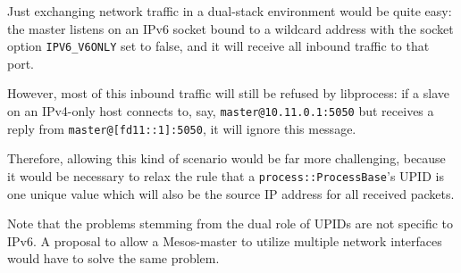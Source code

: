\documentclass{scrreprt}
\begin{document}
Just exchanging network traffic in a dual-stack environment would be quite
easy: the master listens on an IPv6 socket bound to a wildcard address
with the socket option \texttt{IPV6\_V6ONLY} set to false, and it will
receive all inbound traffic to that port.

However, most of this inbound traffic will still be refused by libprocess: if a
slave on an IPv4-only host connects to, say, \texttt{master@10.11.0.1:5050} but
receives a reply from \texttt{master@[fd11::1]:5050}, it will ignore this message.

Therefore, allowing this kind of scenario would be far more challenging,
because it would be necessary to relax the rule that a \texttt{process::ProcessBase}'s
UPID is one unique value which will also be the source IP address for all
received packets.

Note that the problems stemming from the dual role of UPIDs are not
specific to IPv6. A proposal to allow a Mesos-master to utilize multiple network
interfaces would have to solve the same problem.
\end{document}
